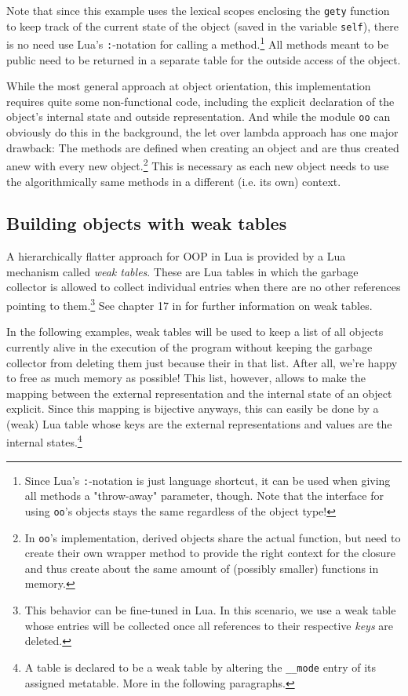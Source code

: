Note that since this example uses the lexical scopes enclosing the \texttt{gety} function to keep track of the current state of the object (saved in the variable \texttt{self}), there is no need use Lua's \texttt{:}-notation for calling a method.\footnote{Since Lua's \texttt{:}-notation is just language shortcut, it can be used when giving all methods a "throw-away" parameter, though. Note that the interface for using \texttt{oo}'s objects stays the same regardless of the object type!} All methods meant to be public need to be returned in a separate table for the outside access of the object.

While the most general approach at object orientation, this implementation requires quite some non-functional code, including the explicit declaration of the object's internal state and outside representation. And while the module \texttt{oo} can obviously do this in the background, the let over lambda approach has one major drawback: The methods are defined when creating an object and are thus created anew with every new object.\footnote{In \texttt{oo}'s implementation, derived objects share the actual function, but need to create their own wrapper method to provide the right context for the closure and thus create about the same amount of (possibly smaller) functions in memory.} This is necessary as each new object needs to use the algorithmically same methods in a different (i.e. its own) context.


\subsection{Building objects with weak tables}

A hierarchically flatter approach for OOP in Lua is provided by a Lua mechanism called \emph{weak tables}. These are Lua tables in which the garbage collector is allowed to collect individual entries when there are no other references pointing to them.\footnote{This behavior can be fine-tuned in Lua. In this scenario, we use a weak table whose entries will be collected once all references to their respective \emph{keys} are deleted.} See chapter 17 in \cite{Ierusalimschy2006} for further information on weak tables.

In the following examples, weak tables will be used to keep a list of all objects currently alive in the execution of the program without keeping the garbage collector from deleting them just because their in that list. After all, we're happy to free as much memory as possible! This list, however, allows to make the mapping between the external representation and the internal state of an object explicit. Since this mapping is bijective anyways, this can easily be done by a (weak) Lua table whose keys are the external representations and values are the internal states.\footnote{A table is declared to be a weak table by altering the \texttt{\_\_mode} entry of its assigned metatable. More in the following paragraphs.}

